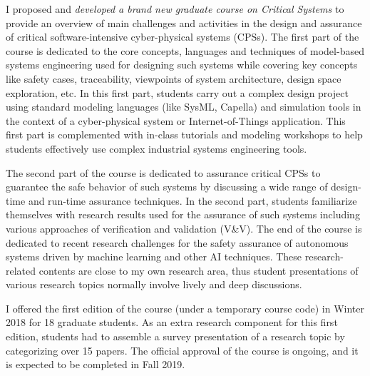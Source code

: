 \documentclass[a4paper,11pt]{article}
\begin{document}
I proposed and \emph{developed a brand new graduate course on Critical Systems} to provide an overview of main challenges and activities in the design and assurance of critical software-intensive cyber-physical systems (CPSs). The first part of the course is dedicated to the core concepts, languages and techniques of model-based systems engineering used for designing such systems while covering key concepts like safety cases, traceability, viewpoints of system architecture, design space exploration, etc. In this first part, students carry out a complex design project using standard modeling languages (like SysML, Capella) and simulation tools in the context of a cyber-physical system or Internet-of-Things application. This first part is complemented with in-class tutorials and modeling workshops to help students effectively use complex industrial systems engineering tools.

The second part of the course is dedicated to assurance critical CPSs to guarantee the safe behavior of such systems by discussing a wide range of design-time and run-time assurance techniques. In the second part, students familiarize themselves with research results used for the assurance of such systems including various approaches of verification and validation (V\&V). The end of the course is dedicated to recent research challenges for the safety assurance of autonomous systems driven by machine learning and other AI techniques. These research-related contents are close to my own research area, thus student presentations of various research topics normally involve lively and deep discussions. 

I offered the first edition of the course (under a temporary course code) in Winter 2018 for 18 graduate students. As an extra research component for this first edition, students had to assemble a survey presentation of a research topic by categorizing over 15 papers. The official approval of the course is ongoing, and it is expected to be completed in Fall 2019. 


\end{document}
